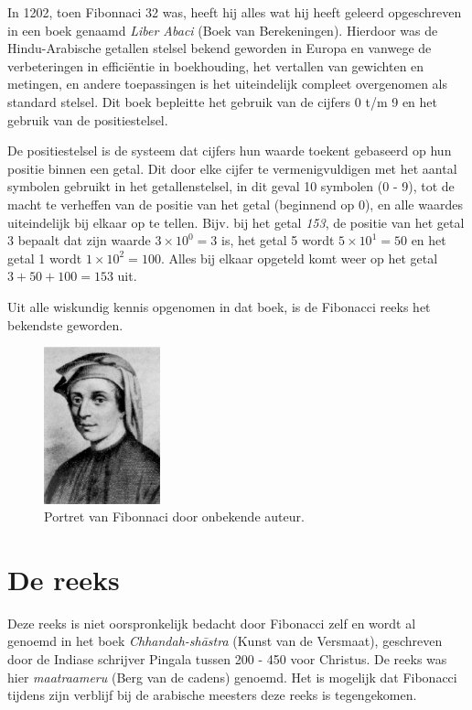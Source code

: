 \documentclass{article}
\begin{document}
In 1202, toen Fibonnaci 32 was, heeft hij alles wat hij heeft geleerd opgeschreven in een boek genaamd \textit{Liber Abaci} (Boek van Berekeningen). Hierdoor was de Hindu-Arabische getallen stelsel bekend geworden in Europa en vanwege de verbeteringen in effici\"entie in boekhouding, het vertallen van gewichten en metingen, en andere toepassingen is het uiteindelijk compleet overgenomen als standard stelsel. Dit boek bepleitte het gebruik van de cijfers 0 t/m 9 en het gebruik van de positiestelsel. 

De positiestelsel is de systeem dat cijfers hun waarde toekent gebaseerd op hun positie binnen een getal. Dit door elke cijfer te vermenigvuldigen met het aantal symbolen gebruikt in het getallenstelsel, in dit geval 10 symbolen (0 - 9), tot de macht te verheffen van de positie van het getal (beginnend op 0), en alle waardes uiteindelijk bij elkaar op te tellen. Bijv. bij het getal \textit{153}, de positie van het getal 3 bepaalt dat zijn waarde \(3 \times 10^0 = 3\) is, het getal 5 wordt \(5 \times 10^1 = 50\) en het getal 1 wordt \(1 \times 10^2 = 100\). Alles bij elkaar opgeteld komt weer op het getal \(3 + 50 + 100 = 153\) uit.

Uit alle wiskundig kennis opgenomen in dat boek, is de Fibonacci reeks het bekendste geworden.

\begin{figure}[Hh]
	\centering
	\includegraphics[width=0.3\textwidth]{Fibonacci.jpg}
	\caption{Portret van Fibonnaci door onbekende auteur.}
\end{figure}

\pagebreak

\section{De reeks}

Deze reeks is niet oorspronkelijk bedacht door Fibonacci zelf en wordt al genoemd in het boek \textit{Chhandah-sh\=astra} (Kunst van de Versmaat), geschreven door de Indiase schrijver Pingala tussen 200 - 450 voor Christus. De reeks was hier \textit{maatraameru} (Berg van de cadens) genoemd. Het is mogelijk dat Fibonacci tijdens zijn verblijf bij de arabische meesters deze reeks is tegengekomen.
\end{document}
